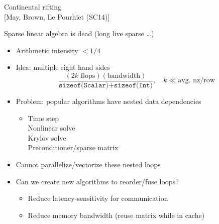 \documentclass{beamer}
\begin{document}
\begin{frame}{Continental rifting}
   \\
  {\scriptsize [May, Brown, Le Pourhiet (SC14)]}
\end{frame}

\begin{frame}{Sparse linear algebra is dead (long live sparse \ldots)}
  \begin{itemize}
  \item Arithmetic intensity $< 1/4$
  \item Idea: multiple right hand sides
    \begin{equation*}
      \frac{(2 k \text{ flops})(\text{bandwidth})}{\texttt{sizeof(Scalar)} + \texttt{sizeof(Int)}}, \quad k \ll \text{avg. nz/row}
    \end{equation*}
  \item Problem: popular algorithms have nested data dependencies
    \begin{itemize}
    \item Time step \\
      \qquad Nonlinear solve \\
      \qquad \qquad Krylov solve \\
      \qquad \qquad \qquad Preconditioner/sparse matrix
    \end{itemize}
  \item Cannot parallelize/vectorize these nested loops
  \item<2> \alert{Can we create new algorithms to reorder/fuse loops?}
    \begin{itemize}
    \item Reduce latency-sensitivity for communication
    \item Reduce memory bandwidth (reuse matrix while in cache)
    \end{itemize}
  \end{itemize}
\end{frame}
\end{document}
